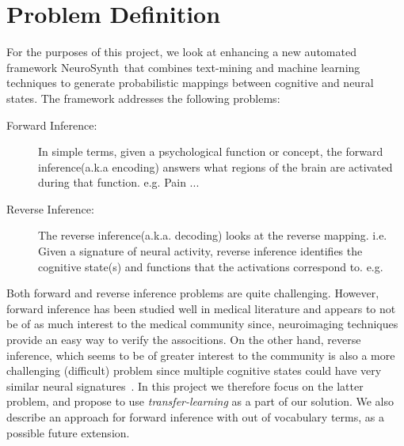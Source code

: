 \documentclass[11pt]{article}
\begin{document}
\section{Problem Definition}
For the purposes of this project, we look at enhancing a new automated framework NeuroSynth~\cite{yarkoni2011large}that combines text-mining and machine learning techniques to generate probabilistic mappings between cognitive and neural states. The framework addresses the following problems:
\begin{description}
\item[Forward Inference: ] In simple terms, given a psychological function or concept, the forward inference(a.k.a encoding) answers what regions of the brain are activated during that function. e.g. Pain ...
\item[Reverse Inference: ] The reverse inference(a.k.a. decoding) looks at the reverse mapping. i.e. Given a signature of neural activity, reverse inference identifies the cognitive state(s) and functions that the activations correspond to. e.g.
\end{description}
Both forward and reverse inference problems are quite challenging. However, forward inference has been studied well in medical literature and appears to not be of as much interest to the medical community since, neuroimaging techniques provide an easy way to verify the associtions. On the other hand, reverse inference, which seems to be of greater interest to the community is also a more challenging (difficult) problem since multiple cognitive states could have very similar neural signatures~\cite{yarkoni2011large}. In this project we therefore focus on the latter problem,  and propose to use \emph{transfer-learning} as a part of our solution.  We also describe an approach for forward inference with out of vocabulary terms, as a possible future extension.
\end{document}
